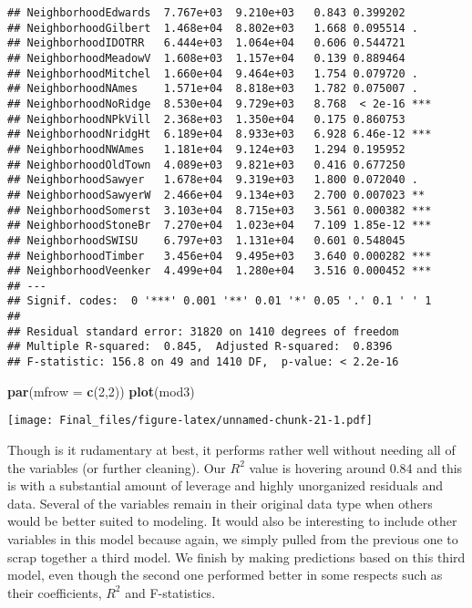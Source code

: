 \documentclass[
]{article}
\newenvironment{Shaded}{\begin{snugshade}}{\end{snugshade}}
\newcommand{\DataTypeTok}[1]{\textcolor[rgb]{0.13,0.29,0.53}{#1}}
\newcommand{\DecValTok}[1]{\textcolor[rgb]{0.00,0.00,0.81}{#1}}
\newcommand{\KeywordTok}[1]{\textcolor[rgb]{0.13,0.29,0.53}{\textbf{#1}}}
\newcommand{\NormalTok}[1]{#1}
\begin{document}
\begin{verbatim}
## NeighborhoodEdwards  7.767e+03  9.210e+03   0.843 0.399202    
## NeighborhoodGilbert  1.468e+04  8.802e+03   1.668 0.095514 .  
## NeighborhoodIDOTRR   6.444e+03  1.064e+04   0.606 0.544721    
## NeighborhoodMeadowV  1.608e+03  1.157e+04   0.139 0.889464    
## NeighborhoodMitchel  1.660e+04  9.464e+03   1.754 0.079720 .  
## NeighborhoodNAmes    1.571e+04  8.818e+03   1.782 0.075007 .  
## NeighborhoodNoRidge  8.530e+04  9.729e+03   8.768  < 2e-16 ***
## NeighborhoodNPkVill  2.368e+03  1.350e+04   0.175 0.860753    
## NeighborhoodNridgHt  6.189e+04  8.933e+03   6.928 6.46e-12 ***
## NeighborhoodNWAmes   1.181e+04  9.124e+03   1.294 0.195952    
## NeighborhoodOldTown  4.089e+03  9.821e+03   0.416 0.677250    
## NeighborhoodSawyer   1.678e+04  9.319e+03   1.800 0.072040 .  
## NeighborhoodSawyerW  2.466e+04  9.134e+03   2.700 0.007023 ** 
## NeighborhoodSomerst  3.103e+04  8.715e+03   3.561 0.000382 ***
## NeighborhoodStoneBr  7.270e+04  1.023e+04   7.109 1.85e-12 ***
## NeighborhoodSWISU    6.797e+03  1.131e+04   0.601 0.548045    
## NeighborhoodTimber   3.456e+04  9.495e+03   3.640 0.000282 ***
## NeighborhoodVeenker  4.499e+04  1.280e+04   3.516 0.000452 ***
## ---
## Signif. codes:  0 '***' 0.001 '**' 0.01 '*' 0.05 '.' 0.1 ' ' 1
## 
## Residual standard error: 31820 on 1410 degrees of freedom
## Multiple R-squared:  0.845,  Adjusted R-squared:  0.8396 
## F-statistic: 156.8 on 49 and 1410 DF,  p-value: < 2.2e-16
\end{verbatim}

\begin{Shaded}
\begin{Highlighting}[]
\KeywordTok{par}\NormalTok{(}\DataTypeTok{mfrow =} \KeywordTok{c}\NormalTok{(}\DecValTok{2}\NormalTok{,}\DecValTok{2}\NormalTok{))}
\KeywordTok{plot}\NormalTok{(mod3)}
\end{Highlighting}
\end{Shaded}

\texttt{[image: Final\_files/figure-latex/unnamed-chunk-21-1.pdf]}

Though is it rudamentary at best, it performs rather well without
needing all of the variables (or further cleaning). Our \(R^2\) value is
hovering around 0.84 and this is with a substantial amount of leverage
and highly unorganized residuals and data. Several of the variables
remain in their original data type when others would be better suited to
modeling. It would also be interesting to include other variables in
this model because again, we simply pulled from the previous one to
scrap together a third model. We finish by making predictions based on
this third model, even though the second one performed better in some
respects such as their coefficients, \(R^2\) and F-statistics.
\end{document}
